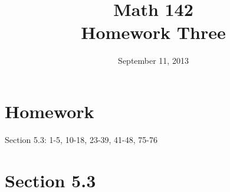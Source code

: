 \documentclass{exam}
\author{}
\date{September 11, 2013}
\title{Math 142 \\ Homework Three}
\begin{document}
  \maketitle

  \section{Homework}
  Section 5.3: 1-5, 10-18, 23-39, 41-48, 75-76


  \ifprintanswers

    \section{Section 5.3}
\end{document}
